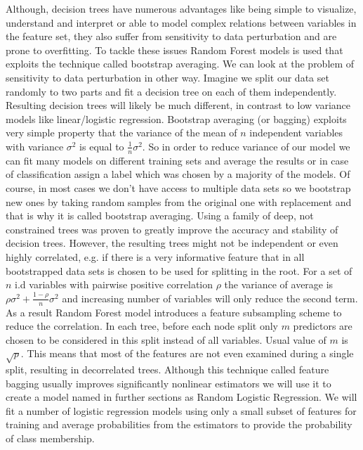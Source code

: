 \documentclass[12pt, wide]{mwart}
\begin{document}
Although, decision trees have numerous advantages like being simple to visualize, understand and interpret or able to model complex relations between variables in the feature set, they also suffer from sensitivity to data perturbation and are prone to overfitting. To tackle these issues Random Forest models is used that exploits the technique called bootstrap averaging. We can look at the problem of sensitivity to data perturbation in other way. Imagine we split our data set randomly to two parts and fit a decision tree on each of them independently. Resulting decision trees will likely be much different, in contrast to low variance models like linear/logistic regression. Bootstrap averaging (or bagging) exploits very simple property that the variance of the mean of $n$ independent variables with variance $\sigma^2$ is equal to $\frac{1}{n}\sigma^2$. So in order to reduce variance of our model we can fit many models on different training sets and average the results or in case of classification assign a label which was chosen by a majority of the models. Of course, in most cases we don't have access to multiple data sets so we bootstrap new ones by taking random samples from the original one with replacement and that is why it is called bootstrap averaging. Using a family of deep, not constrained trees was proven to greatly improve the accuracy and stability of decision trees. However, the resulting trees might not be independent or even highly correlated, e.g. if there is a very informative feature that in all bootstrapped data sets is chosen to be used for splitting in the root. For a set of $n$ i.d variables with pairwise positive correlation $\rho$ the variance of average is $\rho \sigma^2 + \frac{1-\rho}{n}\sigma^2$ and increasing number of variables will only reduce the second term. As a result Random Forest model introduces a feature subsampling scheme to reduce the correlation. In each tree, before each node split only $m$ predictors are chosen to be considered in this split instead of all variables. Usual value of $m$ is  $\sqrt{p}$. This means that most of the features are not even examined during a single split, resulting in decorrelated trees. Although this technique called feature bagging usually improves significantly nonlinear estimators we will use it to create a model named in further sections as Random Logistic Regression. We will fit a number of logistic regression models using only a small subset of features for training and average probabilities from the estimators to provide the probability of class membership.
\end{document}
